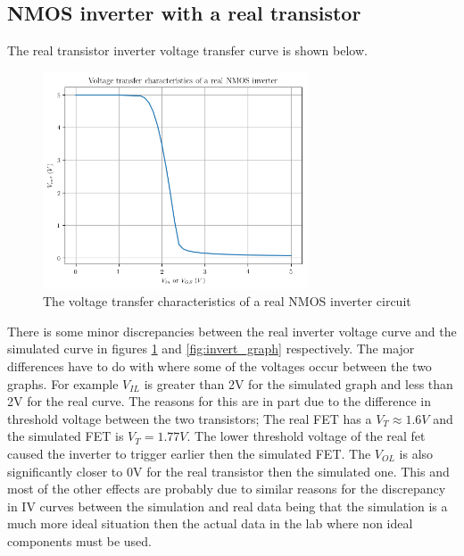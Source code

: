 \documentclass[titlepage, 12pt]{article}
\begin{document}
    \subsection{NMOS inverter with a real transistor}
    The real transistor inverter voltage transfer curve is shown below.
    \begin{figure}
        \centering
        \includegraphics[width=0.7\textwidth]{figures/part_3_invert.png}
        \caption{The voltage transfer characteristics of a real NMOS
        inverter circuit}
        \label{fig:real_inv}
    \end{figure}
    There is some minor discrepancies between the real inverter voltage
    curve and the simulated curve in figures \ref{fig:real_inv} and
    \ref{fig:invert_graph} respectively. The major differences have to
    do with where some of the voltages occur between the two graphs. For
    example $V_{IL}$ is greater than 2V for the simulated graph and less
    than 2V for the real curve. The reasons for this are in part due to
    the difference in threshold voltage between the two transistors; The
    real FET has a $V_T\approx 1.6V$ and the simulated FET is
    $V_T=1.77V$. The lower threshold voltage of the real fet caused the
    inverter to trigger earlier then the simulated FET. The $V_{OL}$ is
    also significantly closer to 0V for the real transistor then the
    simulated one. This and most of the other effects are probably due
    to similar reasons for the discrepancy in IV curves between the
    simulation and real data being that the simulation is a much more
    ideal situation then the actual data in the lab where non ideal
    components must be used.
\end{document}
